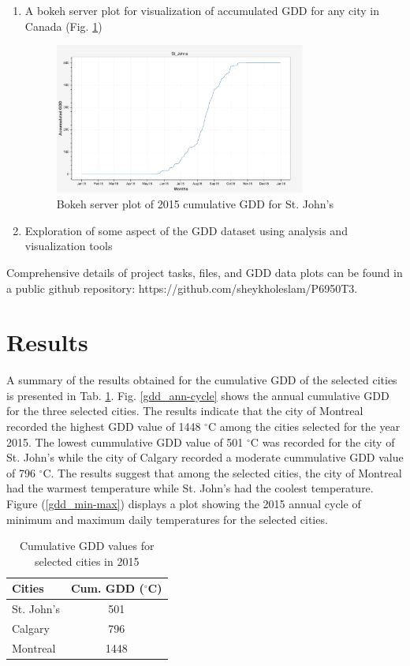 \documentclass{article}
\begin{document}
\begin{enumerate}
\item A bokeh server plot for visualization of accumulated GDD for any city in Canada (Fig. \ref{bokeh-server-plot_sj})

\begin{center}
\begin{figure}[!htb]
\includegraphics[width=3.25in]{./source/Report/op-task_5.png}
\caption{Bokeh server plot of 2015 cumulative GDD for St. John's}
\label{bokeh-server-plot_sj}
\end{figure}
\end{center}

\item Exploration of some aspect of the GDD dataset using analysis and visualization tools
\end{enumerate}

Comprehensive details of project tasks, files, and GDD data plots can be found in a public github repository: https://github.com/sheykholeslam/P6950T3. 


\section{ \bf Results}
A summary of the results obtained for the cumulative GDD of the selected cities is presented in Tab. \ref{tbl:gdd-results}. Fig. \ref{gdd_ann-cycle} shows the annual cumulative GDD for the three selected cities. The results indicate that the city of Montreal recorded the highest GDD value of 1448 $^{\circ}$C among the cities selected for the year 2015. The lowest cummulative GDD value of 501 $^{\circ}$C was recorded for the city of St. John's while the city of Calgary recorded a moderate cummulative GDD value of 796 $^{\circ}$C. The results suggest that among the selected cities, the city of Montreal had the warmest temperature while St. John's had the coolest temperature. Figure (\ref{gdd_min-max}) displays a plot showing the 2015 annual cycle of minimum and maximum daily temperatures for the selected cities.

\begin{table}[h]
\caption{Cumulative GDD values for selected cities in 2015} 
\label{tbl:gdd-results}
\centering 
\begin{tabular}{l c}
\hline
\textbf{Cities} & \textbf{Cum. GDD} \textbf($^{\circ}$C) \\
\hline
St. John's & 501 \\
Calgary & 796 \\
Montreal & 1448 \\
\hline
\end{tabular}
\end{table}
\end{document}
